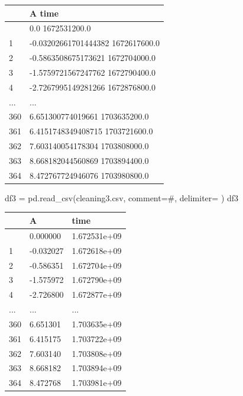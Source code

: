 \documentclass[
  letterpaper,
  DIV=11,
  numbers=noendperiod,
  oneside]{scrreprt}
\newenvironment{Shaded}{\begin{snugshade}}{\end{snugshade}}
\newcommand{\NormalTok}[1]{\textcolor[rgb]{0.00,0.23,0.31}{#1}}
\newcommand{\OperatorTok}[1]{\textcolor[rgb]{0.37,0.37,0.37}{#1}}
\newcommand{\StringTok}[1]{\textcolor[rgb]{0.13,0.47,0.30}{#1}}
\begin{document}
\begin{longtable}[]{@{}ll@{}}
\toprule\noalign{}
& A time \\
\midrule\noalign{}
\endhead
\bottomrule\noalign{}
\endlastfoot
0 & 0.0 1672531200.0 \\
1 & -0.03202661701444382 1672617600.0 \\
2 & -0.5863508675173621 1672704000.0 \\
3 & -1.5759721567247762 1672790400.0 \\
4 & -2.7267995149281266 1672876800.0 \\
... & ... \\
360 & 6.651300774019661 1703635200.0 \\
361 & 6.4151748349408715 1703721600.0 \\
362 & 7.603140054178304 1703808000.0 \\
363 & 8.668182044560869 1703894400.0 \\
364 & 8.472767724946076 1703980800.0 \\
\end{longtable}

\begin{Shaded}
\begin{Highlighting}[]
\NormalTok{df3 }\OperatorTok{=}\NormalTok{ pd.read\_csv(}\StringTok{\textquotesingle{}cleaning3.csv\textquotesingle{}}\NormalTok{, comment}\OperatorTok{=}\StringTok{\textquotesingle{}\#\textquotesingle{}}\NormalTok{, delimiter}\OperatorTok{=}\StringTok{\textquotesingle{} \textquotesingle{}}\NormalTok{)}
\NormalTok{df3}
\end{Highlighting}
\end{Shaded}

\begin{longtable}[]{@{}lll@{}}
\toprule\noalign{}
& A & time \\
\midrule\noalign{}
\endhead
\bottomrule\noalign{}
\endlastfoot
0 & 0.000000 & 1.672531e+09 \\
1 & -0.032027 & 1.672618e+09 \\
2 & -0.586351 & 1.672704e+09 \\
3 & -1.575972 & 1.672790e+09 \\
4 & -2.726800 & 1.672877e+09 \\
... & ... & ... \\
360 & 6.651301 & 1.703635e+09 \\
361 & 6.415175 & 1.703722e+09 \\
362 & 7.603140 & 1.703808e+09 \\
363 & 8.668182 & 1.703894e+09 \\
364 & 8.472768 & 1.703981e+09 \\
\end{longtable}
\end{document}
